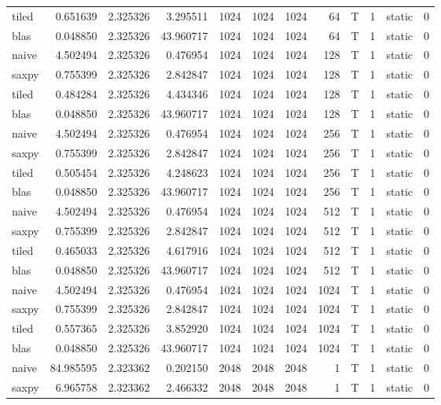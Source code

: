 \documentclass[
  12pt,
  xcolor = usenames,dvipsnames]{article}
\begin{document}
\begin{table}[!h]
{\begin{tabular}[t]{lrrrrrrrlrlr}
tiled & 0.651639 & 2.325326 & 3.295511 & 1024 & 1024 & 1024 & 64 & T & 1 & static & 0\\
blas & 0.048850 & 2.325326 & 43.960717 & 1024 & 1024 & 1024 & 64 & T & 1 & static & 0\\
naive & 4.502494 & 2.325326 & 0.476954 & 1024 & 1024 & 1024 & 128 & T & 1 & static & 0\\
\addlinespace
saxpy & 0.755399 & 2.325326 & 2.842847 & 1024 & 1024 & 1024 & 128 & T & 1 & static & 0\\
tiled & 0.484284 & 2.325326 & 4.434346 & 1024 & 1024 & 1024 & 128 & T & 1 & static & 0\\
blas & 0.048850 & 2.325326 & 43.960717 & 1024 & 1024 & 1024 & 128 & T & 1 & static & 0\\
naive & 4.502494 & 2.325326 & 0.476954 & 1024 & 1024 & 1024 & 256 & T & 1 & static & 0\\
saxpy & 0.755399 & 2.325326 & 2.842847 & 1024 & 1024 & 1024 & 256 & T & 1 & static & 0\\
\addlinespace
tiled & 0.505454 & 2.325326 & 4.248623 & 1024 & 1024 & 1024 & 256 & T & 1 & static & 0\\
blas & 0.048850 & 2.325326 & 43.960717 & 1024 & 1024 & 1024 & 256 & T & 1 & static & 0\\
naive & 4.502494 & 2.325326 & 0.476954 & 1024 & 1024 & 1024 & 512 & T & 1 & static & 0\\
saxpy & 0.755399 & 2.325326 & 2.842847 & 1024 & 1024 & 1024 & 512 & T & 1 & static & 0\\
tiled & 0.465033 & 2.325326 & 4.617916 & 1024 & 1024 & 1024 & 512 & T & 1 & static & 0\\
\addlinespace
blas & 0.048850 & 2.325326 & 43.960717 & 1024 & 1024 & 1024 & 512 & T & 1 & static & 0\\
naive & 4.502494 & 2.325326 & 0.476954 & 1024 & 1024 & 1024 & 1024 & T & 1 & static & 0\\
saxpy & 0.755399 & 2.325326 & 2.842847 & 1024 & 1024 & 1024 & 1024 & T & 1 & static & 0\\
tiled & 0.557365 & 2.325326 & 3.852920 & 1024 & 1024 & 1024 & 1024 & T & 1 & static & 0\\
blas & 0.048850 & 2.325326 & 43.960717 & 1024 & 1024 & 1024 & 1024 & T & 1 & static & 0\\
\addlinespace
naive & 84.985595 & 2.323362 & 0.202150 & 2048 & 2048 & 2048 & 1 & T & 1 & static & 0\\
saxpy & 6.965758 & 2.323362 & 2.466332 & 2048 & 2048 & 2048 & 1 & T & 1 & static & 0\\

\end{tabular}}
\end{table}
\end{document}
